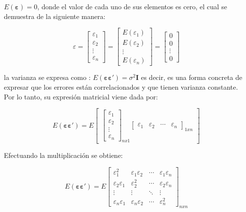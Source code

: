 \documentclass[
]{book}
\begin{document}
\(E(\boldsymbol{\varepsilon})=0\), donde el valor de cada uno de sus elementos es cero, el cual se demuestra de la siguiente manera:

\[
\begin{equation}
\varepsilon = \begin{bmatrix}
\varepsilon_{1}\\ 
\varepsilon_{2}\\ 
\vdots \\
\varepsilon_{n}
\end{bmatrix}
= \begin{bmatrix}
E(\varepsilon_{1})\\ 
E(\varepsilon_{2})\\ 
\vdots \\
E(\varepsilon_{n})
\end{bmatrix}
= \begin{bmatrix}
0\\ 
0\\ 
\vdots \\
0 
\end{bmatrix}
\label{eq:definicion-y-suposiciones-errores}
\end{equation}
\]

la varianza se expresa como : \(E(\boldsymbol{\varepsilon\varepsilon'})=\sigma^2\boldsymbol{I}\) es decir, es una forma concreta de expresar que los errores están correlacionados y que tienen varianza constante. Por lo tanto, su expresión matricial viene dada por:

\[
E(\boldsymbol{\varepsilon\varepsilon'})=E\begin{bmatrix}
\begin{bmatrix}
\varepsilon_{1}\\ 
\varepsilon_{2}\\ 
\vdots \\
\varepsilon_{n}
\end{bmatrix}_{nx1}
\begin{bmatrix}
 \varepsilon_{1}&  \varepsilon_{2}&  \cdots & \varepsilon_{n}
\end{bmatrix}_{1xn}
\end{bmatrix}
\]

Efectuando la multiplicación se obtiene:

\[
E(\boldsymbol{\varepsilon\varepsilon'})=E\begin{bmatrix}
 \varepsilon_{1}^2&  \varepsilon_{1}\varepsilon_{2}&  \cdots & \varepsilon_{1}\varepsilon_{n}\\ 
 \varepsilon_{2}\varepsilon_{1}&  \varepsilon_{2}^2&  \cdots& \varepsilon_{2}\varepsilon_{n}\\ 
 \vdots &  \vdots &  \ddots & \vdots\\ 
 \varepsilon_{n}\varepsilon_{1}&  \varepsilon_{n}\varepsilon_{2}&  \cdots& \varepsilon_{n}^2
\end{bmatrix}_{nxn}
\]
\end{document}
